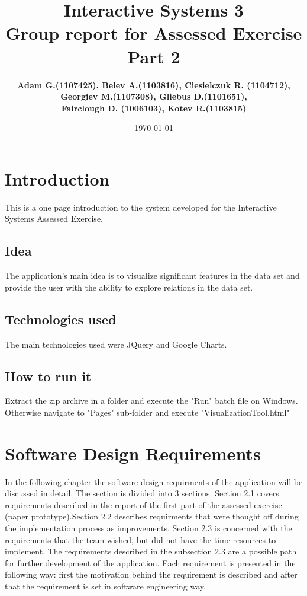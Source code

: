 \documentclass[a4paper]{article}
\title{Interactive Systems 3\\ \vspace{4mm} 
Group report for Assessed Exercise Part 2}
\author{\bf Adam G.(1107425), Belev A.(1103816), Ciesielczuk R. (1104712),\\ \bf Georgiev M.(1107308), Gliebus D.(1101651),\\ \bf Fairclough D. (1006103), Kotev R.(1103815)}
\date{\today}
\begin{document}
\maketitle
\newpage



\section{Introduction}
This is a one page introduction to the system developed for the Interactive Systems Assessed Exercise. 
\subsection{Idea}
The application's main idea is to visualize significant features in the data set and provide the user with the ability to explore relations in the data set.
\subsection{Technologies used} The main technologies used were JQuery and Google Charts.
\subsection{How to run it} Extract the zip archive in a folder and execute the "Run" batch file on Windows. Otherwise navigate to "Pages" sub-folder and execute "VisualizationTool.html"



\section{Software Design Requirements}
In the following chapter the software design requirments of the application will be discussed in detail. The section is divided into 3 sections. Section 2.1 covers requirements described in the report of the first part of the assessed exercise (paper prototype).Section 2.2 describes requirments that were thought off during the implementation process as improvements. Section 2.3 is concerned with the requirements that the team wished, but did not have the time resources to implement. The requirements described in the subsection 2.3 are a possible path for further development of the application. Each requirement is presented in the following way: first the motivation behind the requirement is described and after that the requirement is set in software engineering way.\\
\end{document}
